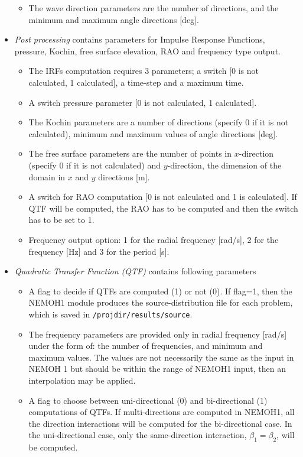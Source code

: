 \documentclass[12pt,a4paper,titlepage]{article}
\begin{document}
\begin{itemize}
\begin{itemize}
\item The wave direction parameters are the number of directions, and the minimum and maximum angle directions [deg].
\end{itemize}
\item \emph{Post processing} contains parameters for Impulse Response Functions, pressure, Kochin, free surface elevation, RAO and frequency type output.
\begin{itemize}
\item The IRFs computation requires 3 parameters; a switch [0 is not calculated, 1 calculated], a time-step and a maximum time.
\item A switch pressure parameter [0 is not calculated, 1 calculated].
\item The Kochin parameters are a number of directions (specify 0 if it is not calculated), minimum and maximum values of angle directions [deg].
\item The free surface parameters are the number of points in $x$-direction (specify 0 if it is not calculated) and $y$-direction, the dimension of the domain in $x$ and $y$ directions [m].
\item A switch for RAO computation [0 is not calculated and 1 is calculated]. If QTF will be computed, the RAO has to be computed and then the switch has to be set to 1.
\item Frequency output option: 1 for the radial frequency [rad/s], 2 for the frequency [Hz] and 3 for the period [s].
\end{itemize}
\item \emph{Quadratic Transfer Function (QTF)} contains following parameters
\begin{itemize}
\item A flag to decide if QTFs are computed (1) or not (0). If flag=1, then the NEMOH1 module produces the source-distribution file for each problem, which is saved in \texttt{/projdir/results/source}.
\item The frequency parameters are provided only in radial frequency [rad/s] under the form of: the number of frequencies, and minimum and maximum values. The values are not necessarily the same as the input in NEMOH 1 but should be within the range of NEMOH1 input, then an interpolation may be applied.
\item A flag to choose between uni-directional (0) and bi-directional (1) computations of QTFs. If multi-directions are computed in NEMOH1, all the direction interactions will be computed for the bi-directional case. In the uni-directional case, only the same-direction interaction, $\beta_1=\beta_2$, will be computed.

\end{itemize}
\end{itemize}
\end{document}
